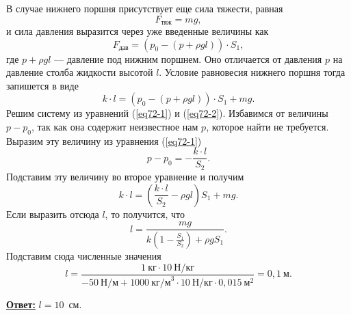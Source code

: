 В случае нижнего поршня присутствует еще сила тяжести, равная
\[
	F_{\textit{тяж}} = mg,
\]
и сила давления выразится через уже введенные величины как
\[
	F_{\textit{дав}} = \left( p_0 - \left( p + \rho g l \right) \right) \cdot S_1,
\]
где $p + \rho g l$ --- давление под нижним поршнем. Оно отличается от давления $p$ на давление столба жидкости высотой $l$. Условие равновесия нижнего поршня тогда запишется в виде
\begin{equation}
\label{eq72-2}
	k \cdot l = \left( p_0 - \left( p + \rho g l \right) \right) \cdot S_1 + mg.
\end{equation}
Решим систему из уравнений (\ref{eq72-1}) и (\ref{eq72-2}). Избавимся от величины $p-p_0$, так как она содержит неизвестное нам $p$, которое найти не требуется. Выразим эту величину из уравнения (\ref{eq72-1})
\[
	p-p_0 = -\frac{k \cdot l}{S_2}.
\]
Подставим эту величину во второе уравнение и получим
\[
	k \cdot l = \left( \frac{k \cdot l}{S_2} - \rho g l \right) S_1 + mg.
\]
Если выразить отсюда $l$, то получится, что 
\[
	l = \frac{mg}{k \left(1 - \frac{S_1}{S_2}\right) + \rho g S_1}.
\]
Подставим сюда численные значения
\[
	l = \frac{1~\text{кг} \cdot 10~\text{Н/кг}}{-50~\text{Н/м}  + 1000~\text{кг/м}^3 \cdot 10~\text{Н/кг} \cdot 0{,}015~\text{м}^2} = 0{,}1~\text{м}.
\]

\underline{\textbf{Ответ:}} $l = 10$~см. 

